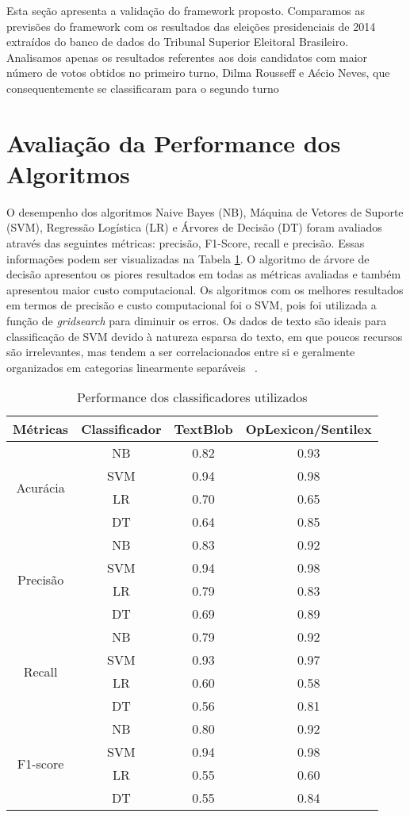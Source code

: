 Esta seção apresenta a validação do framework proposto.
Comparamos as previsões do framework com os resultados das
eleições presidenciais de 2014 extraídos do banco de dados do
Tribunal Superior Eleitoral Brasileiro. Analisamos apenas os
resultados referentes aos dois candidatos com maior número
de votos obtidos no primeiro turno, Dilma Rousseff e Aécio
Neves, que consequentemente se classificaram para o segundo
turno

\section{Avaliação da Performance dos Algoritmos}

O desempenho dos algoritmos Naive Bayes (NB), Máquina de
Vetores de Suporte (SVM), Regressão Logística (LR) e Árvores de Decisão (DT)
foram avaliados através das seguintes métricas: precisão, F1-Score,
recall e precisão. Essas informações podem ser visualizadas
na Tabela \ref{tb:metricas}.
O algoritmo de árvore de decisão apresentou os piores resultados em todas
as métricas avaliadas e também apresentou maior custo
computacional. Os algoritmos com os melhores resultados
em termos de precisão e custo computacional foi o \acrshort{SVM}, pois foi utilizada a função de \textit{gridsearch} para
diminuir os erros.
Os dados de texto são ideais para classificação de SVM
devido à natureza esparsa do texto, em que poucos recursos
são irrelevantes, mas tendem a ser correlacionados entre si e
geralmente organizados em categorias linearmente separáveis
~\cite{medhat}.


\begin{table}[htbp]
    \centering
    \caption{Performance dos classificadores utilizados}
    \label{tb:metricas}
    \begin{tabular}{@{}cccc@{}}
    \\    \hline
    Métricas & Classificador & TextBlob & OpLexicon/Sentilex \\  \hline
    \multirow{4}{*}{Acurácia} & NB & 0.82 & 0.93 \\  
     & SVM & 0.94 & 0.98 \\ 
     & LR & 0.70 & 0.65 \\
     & DT & 0.64 & 0.85 \\ \hline
    \multirow{4}{*}{Precisão} & NB & 0.83 & 0.92 \\ 
     & SVM & 0.94 & 0.98 \\ 
     & LR & 0.79 & 0.83 \\ 
     & DT & 0.69 & 0.89 \\ \hline
    \multirow{4}{*}{Recall} & NB & 0.79 & 0.92 \\ 
     & SVM & 0.93 & 0.97 \\ 
     & LR & 0.60 & 0.58 \\ 
     & DT & 0.56 & 0.81 \\ \hline
    \multirow{4}{*}{F1-score} & NB & 0.80 & 0.92 \\ 
     & SVM & 0.94 & 0.98 \\ 
     & LR & 0.55 & 0.60 \\ 
     & DT & 0.55 & 0.84 \\ \hline
    \end{tabular}
    \end{table}
    
